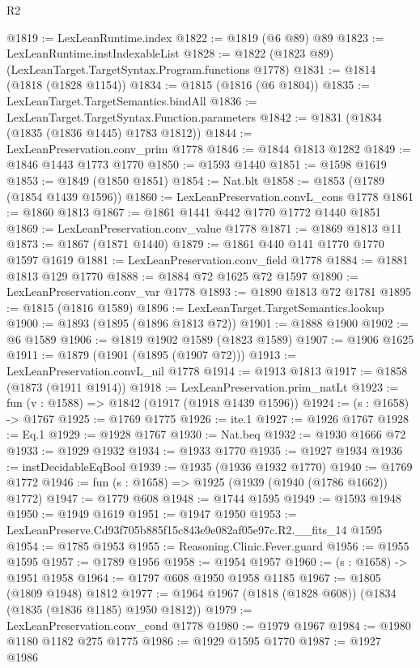\begin{lexlean}{R2}
\begin{coremodule}
@1819 := LexLeanRuntime.index
@1822 := @1819 (@6 @89) @89
@1823 := LexLeanRuntime.instIndexableList
@1828 := @1822 (@1823 @89) (LexLeanTarget.TargetSyntax.Program.functions @1778)
@1831 := @1814 (@1818 (@1828 @1154))
@1834 := @1815 (@1816 (@6 @1804))
@1835 := LexLeanTarget.TargetSemantics.bindAll
@1836 := LexLeanTarget.TargetSyntax.Function.parameters
@1842 := @1831 (@1834 (@1835 (@1836 @1445) @1783 @1812))
@1844 := LexLeanPreservation.conv_prim @1778
@1846 := @1844 @1813 @1282
@1849 := @1846 @1443 @1773 @1770
@1850 := @1593 @1440
@1851 := @1598 @1619
@1853 := @1849 (@1850 @1851)
@1854 := Nat.blt
@1858 := @1853 (@1789 (@1854 @1439 @1596))
@1860 := LexLeanPreservation.convL_cons @1778
@1861 := @1860 @1813
@1867 := @1861 @1441 @442 @1770 @1772 @1440 @1851
@1869 := LexLeanPreservation.conv_value @1778
@1871 := @1869 @1813 @11
@1873 := @1867 (@1871 @1440)
@1879 := @1861 @440 @141 @1770 @1770 @1597 @1619
@1881 := LexLeanPreservation.conv_field @1778
@1884 := @1881 @1813 @129 @1770
@1888 := @1884 @72 @1625 @72 @1597
@1890 := LexLeanPreservation.conv_var @1778
@1893 := @1890 @1813 @72 @1781
@1895 := @1815 (@1816 @1589)
@1896 := LexLeanTarget.TargetSemantics.lookup
@1900 := @1893 (@1895 (@1896 @1813 @72))
@1901 := @1888 @1900
@1902 := @6 @1589
@1906 := @1819 @1902 @1589 (@1823 @1589)
@1907 := @1906 @1625
@1911 := @1879 (@1901 (@1895 (@1907 @72)))
@1913 := LexLeanPreservation.convL_nil @1778
@1914 := @1913 @1813
@1917 := @1858 (@1873 (@1911 @1914))
@1918 := LexLeanPreservation.prim_natLt
@1923 := fun (v : @1588) => @1842 (@1917 (@1918 @1439 @1596))
@1924 := (s : @1658) -> @1767
@1925 := @1769 @1775
@1926 := ite.{1}
@1927 := @1926 @1767
@1928 := Eq.{1}
@1929 := @1928 @1767
@1930 := Nat.beq
@1932 := @1930 @1666 @72
@1933 := @1929 @1932
@1934 := @1933 @1770
@1935 := @1927 @1934
@1936 := instDecidableEqBool
@1939 := @1935 (@1936 @1932 @1770)
@1940 := @1769 @1772
@1946 := fun (s : @1658) => @1925 (@1939 (@1940 (@1786 @1662)) @1772)
@1947 := @1779 @608
@1948 := @1744 @1595
@1949 := @1593 @1948
@1950 := @1949 @1619
@1951 := @1947 @1950
@1953 := LexLeanPreserve.Cd93f705b885f15c843e9e082af05e97c.R2.__fits_14 @1595
@1954 := @1785 @1953
@1955 := Reasoning.Clinic.Fever.guard
@1956 := @1955 @1595
@1957 := @1789 @1956
@1958 := @1954 @1957
@1960 := (s : @1658) -> @1951 @1958
@1964 := @1797 @608 @1950 @1958 @1185
@1967 := @1805 (@1809 @1948) @1812
@1977 := @1964 @1967 (@1818 (@1828 @608)) (@1834 (@1835 (@1836 @1185) @1950 @1812))
@1979 := LexLeanPreservation.conv_cond @1778
@1980 := @1979 @1967
@1984 := @1980 @1180 @1182 @275 @1775
@1986 := @1929 @1595 @1770
@1987 := @1927 @1986

\end{coremodule}
\end{lexlean}

